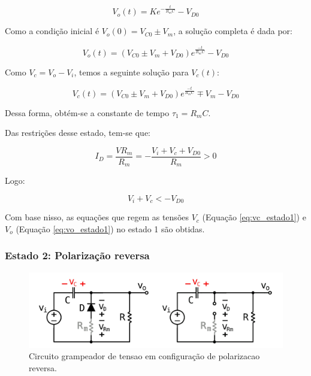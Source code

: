 \begin{equation}
    \tag*{Solucao completa}
    V_o(t) = K e^{-\frac{t}{R_m C}} - V_{D0}
\end{equation}

Como a condição inicial é $V_o(0) = V_{C0} \pm V_m$, a solução completa é dada por:

\begin{equation}
    \label{eq:vo_estado1}
    V_o(t) = (V_{C0} \pm V_m + V_{D0}) e^\frac{-t}{R_m C} - V_{D0}
\end{equation}

Como $V_c = V_o - V_i$, temos a seguinte solução para $V_c(t)$:

\begin{equation}
    \label{eq:vc_estado1}
    V_c(t) = (V_{C0} \pm V_m + V_{D0}) e^\frac{-t}{R_m C} \mp V_m - V_{D0}
\end{equation}

Dessa forma, obtém-se a constante de tempo $\tau_1 = R_m C$.

Das restrições desse estado, tem-se que:

\begin{equation}
    I_D = \frac{V R_m}{R_m} = - \frac{V_i + V_c + V_{D0}}{R_m} > 0
\end{equation}

Logo:

\begin{equation}
    V_i + V_c < - V_{D0}
\end{equation}

Com base nisso, as equações que regem as tensões $V_c$ (Equação \ref{eq:vc_estado1}) e $V_o$ (Equação \ref{eq:vo_estado1}) no estado 1 são obtidas.


\subsubsection{Estado 2: Polarização reversa}


\begin{figure}[h]
    \centering
    \includegraphics[width=1\columnwidth]{images/o_circuito_reverso.png}
    \caption{Circuito grampeador de tensao em configuração de polarizacao reversa.}
\end{figure}

